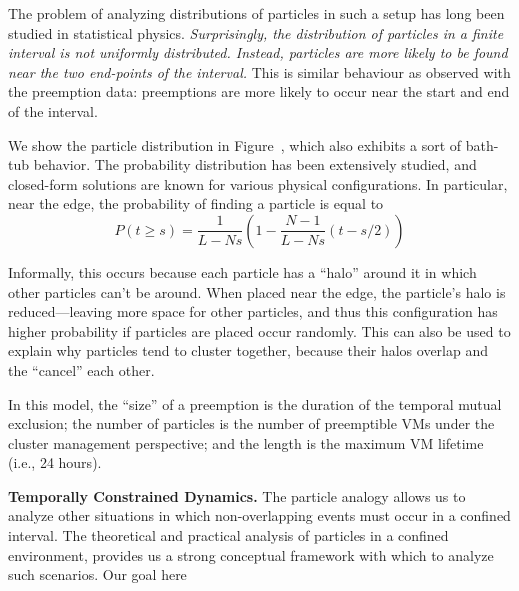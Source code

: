 The problem of analyzing distributions of particles in such a setup has long been studied in statistical physics. 
\emph{Surprisingly, the distribution of particles in a finite interval is not uniformly distributed. 
  Instead, particles are more likely to be found near the two end-points of the interval.}
This is similar behaviour as observed with the preemption data: preemptions are more likely to occur near the start and end of the interval. 


We show the particle distribution in Figure~\cite{fig:particle-sim}, which also exhibits a sort of bath-tub behavior. 
The probability distribution has been extensively studied, and closed-form solutions are known for various physical configurations.
In particular, near the edge, the probability of finding a particle is equal to
\begin{equation}
  \label{eq:balls-krauth}
  P(t\geq s) = \dfrac{1}{L-Ns}\left(1-\dfrac{N-1}{L-Ns}(t-s/2)\right)
\end{equation}

Informally, this occurs because each particle has a ``halo'' around it in which other particles can't be around. 
When placed near the edge, the particle's halo is reduced---leaving more space for other particles, and thus this configuration has higher probability if particles are placed occur randomly. 
This can also be used to explain why particles tend to cluster together, because their halos overlap and the ``cancel'' each other. 


In this model, the ``size'' of a preemption is the duration of the temporal mutual exclusion; the number of particles is the number of preemptible VMs under the cluster management perspective; and the length is the maximum VM lifetime (i.e., 24 hours). 

\noindent \textbf{Temporally Constrained Dynamics.}
The particle analogy allows us to analyze other situations in which non-overlapping events must occur in a confined interval. 
The theoretical and practical analysis of particles in a confined environment, provides us a strong conceptual framework with which to analyze such scenarios. 
Our goal here 




